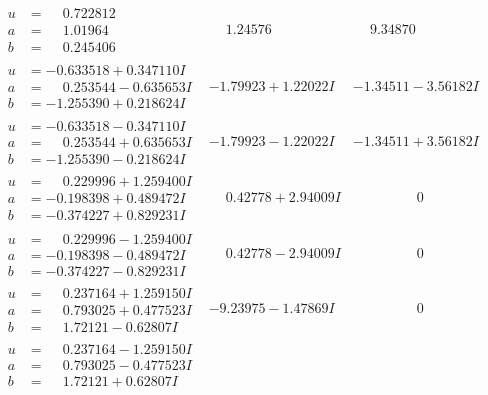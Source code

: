 \documentclass[1p]{elsarticle_modified}
\theoremstyle{definition}
\begin{document}
$$\begin{array}{c|c|c}
\begin{aligned}
u &= \phantom{-}0.722812\phantom{ +0.000000I} \\
a &= \phantom{-}1.01964\phantom{ +0.000000I} \\
b &= \phantom{-}0.245406\phantom{ +0.000000I}\end{aligned}
 & \phantom{-}1.24576\phantom{ +0.000000I} & \phantom{-}9.34870\phantom{ +0.000000I} \\ \hline\begin{aligned}
u &= -0.633518 + 0.347110 I \\
a &= \phantom{-}0.253544 - 0.635653 I \\
b &= -1.255390 + 0.218624 I\end{aligned}
 & -1.79923 + 1.22022 I & -1.34511 - 3.56182 I \\ \hline\begin{aligned}
u &= -0.633518 - 0.347110 I \\
a &= \phantom{-}0.253544 + 0.635653 I \\
b &= -1.255390 - 0.218624 I\end{aligned}
 & -1.79923 - 1.22022 I & -1.34511 + 3.56182 I \\ \hline\begin{aligned}
u &= \phantom{-}0.229996 + 1.259400 I \\
a &= -0.198398 + 0.489472 I \\
b &= -0.374227 + 0.829231 I\end{aligned}
 & \phantom{-}0.42778 + 2.94009 I & \phantom{-0.000000 } 0 \\ \hline\begin{aligned}
u &= \phantom{-}0.229996 - 1.259400 I \\
a &= -0.198398 - 0.489472 I \\
b &= -0.374227 - 0.829231 I\end{aligned}
 & \phantom{-}0.42778 - 2.94009 I & \phantom{-0.000000 } 0 \\ \hline\begin{aligned}
u &= \phantom{-}0.237164 + 1.259150 I \\
a &= \phantom{-}0.793025 + 0.477523 I \\
b &= \phantom{-}1.72121 - 0.62807 I\end{aligned}
 & -9.23975 - 1.47869 I & \phantom{-0.000000 } 0 \\ \hline\begin{aligned}
u &= \phantom{-}0.237164 - 1.259150 I \\
a &= \phantom{-}0.793025 - 0.477523 I \\
b &= \phantom{-}1.72121 + 0.62807 I\end{aligned}

\end{array}$$
\end{document}
